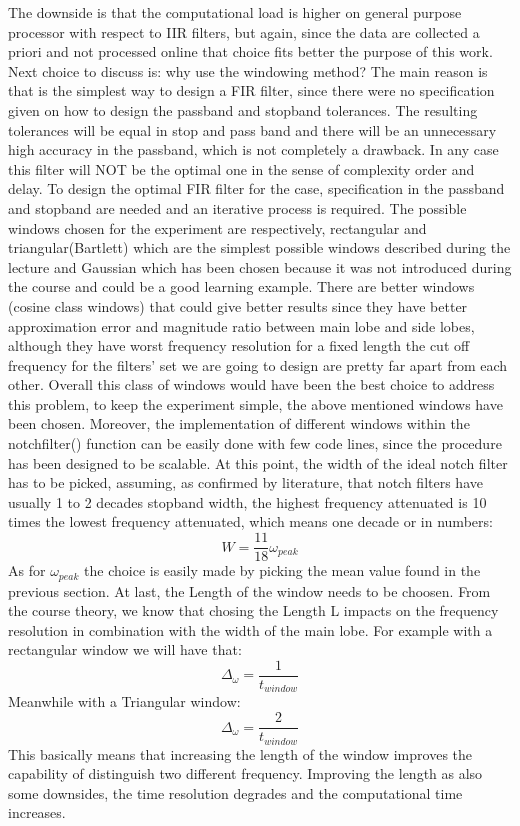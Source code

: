 \documentclass[12pt,a4paper,twoside]{article}
\begin{document}
The downside is that the computational load is higher on general purpose processor with respect to IIR filters, but again, since the data are collected a priori and not processed online that choice fits better the purpose of this work.
Next choice to discuss is: why use the windowing method?
The main reason is that is the simplest way to design a FIR filter, since there were no specification given on how to design the passband and stopband tolerances. The resulting tolerances will be equal in stop and pass band and there will be an unnecessary high accuracy in the passband, which is not completely a drawback. In any case this filter will NOT be the optimal one in the sense of complexity order and delay. To design the optimal FIR filter for the case, specification in the passband and stopband are needed and an iterative process is required.
The possible windows chosen for the experiment are respectively, rectangular and triangular(Bartlett) which are the simplest possible windows described during the lecture and Gaussian which has been chosen because it was not introduced during the course and could be a good learning example. There are better windows (cosine class windows) that could give better results since they have better approximation error and magnitude ratio between main lobe and side lobes, although they have worst frequency resolution for a fixed length the cut off frequency for the filters' set we are going to design are pretty far apart from each other. Overall this class of windows would have been the best choice to address this problem, to keep the experiment simple, the above mentioned windows have been chosen. Moreover, the implementation of different windows within the notchfilter() function can be easily done with few code lines, since the procedure has been designed to be scalable.
At this point, the width of the ideal notch filter has to be picked, assuming, as confirmed by literature, that notch filters have usually 1 to 2 decades stopband width, the highest frequency attenuated is 10 times the lowest frequency attenuated, which means one decade or in numbers: $$ W = \frac{11}{18} \omega_{peak}$$
As for $\omega_{peak}$ the choice is easily made by picking the mean value found in the previous section.
At last, the Length of the window needs to be choosen. From the course theory, we know that chosing the Length L impacts on the frequency resolution in combination with the width of the main lobe. For example with a rectangular window we will have that:
$$ \Delta_{\omega} = \frac{1}{t_{window}}$$
Meanwhile with a Triangular window: 
$$ \Delta_{\omega} = \frac{2}{t_{window}}$$
This basically means that increasing the length of the window improves the capability of distinguish two different frequency.
Improving the length as also some downsides, the time resolution degrades and the computational time increases.
\end{document}
